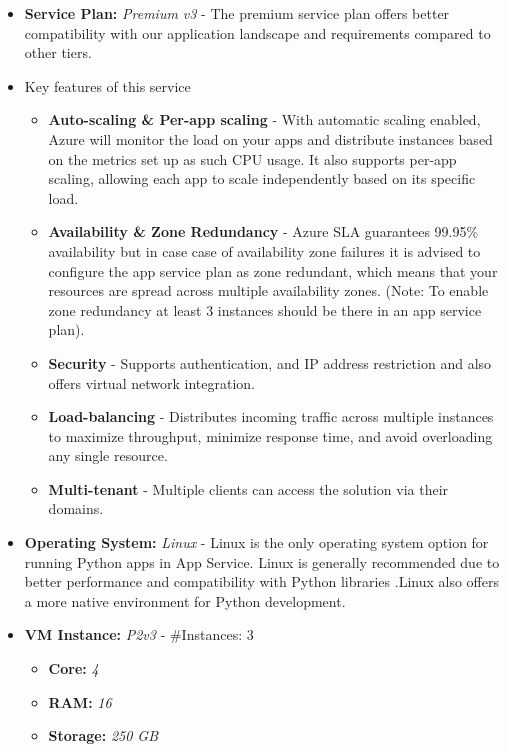 \documentclass{llncs}
\begin{document}
\begin{itemize}
    \item \textbf{Service Plan:} \textit{Premium v3} - The premium service plan offers better compatibility with our application landscape and requirements compared to other tiers.
    \item Key features of this service
          \begin{itemize}
              \item \textbf{Auto-scaling \& Per-app scaling} - With automatic scaling enabled, Azure will monitor the load on your apps and distribute instances based on the metrics set up as such CPU usage. It also supports per-app scaling, allowing each app to scale independently based on its specific load.
              \item \textbf{Availability \& Zone Redundancy} - Azure SLA guarantees 99.95\% availability but in case case of availability zone failures it is advised to configure the app service plan as zone redundant, which means that your resources are spread across multiple availability zones. (Note: To enable zone redundancy at least 3 instances should be there in an app service plan).
              \item \textbf{Security} - Supports authentication, and IP address restriction and also offers virtual network integration.
              \item \textbf{Load-balancing} - Distributes incoming traffic across multiple instances to maximize throughput, minimize response time, and avoid overloading any single resource.
              \item \textbf{Multi-tenant} - Multiple clients can access the solution via their domains.
          \end{itemize}

    \item \textbf{Operating System:} \textit{Linux} - Linux is the only operating system option for running Python apps in App Service. Linux is generally recommended due to better performance and compatibility with Python libraries
 .Linux also offers a more native environment for Python development\cite{MicrosoftAzurePythonConfig}.

    \item \textbf{VM Instance:} \textit{P2v3} - \#Instances: 3

          \begin{itemize}
              \item \textbf{Core:} \textit{4}
              \item \textbf{RAM:} \textit{16}
              \item \textbf{Storage:} \textit{250 GB}
          \end{itemize}
\end{itemize}
\end{document}
